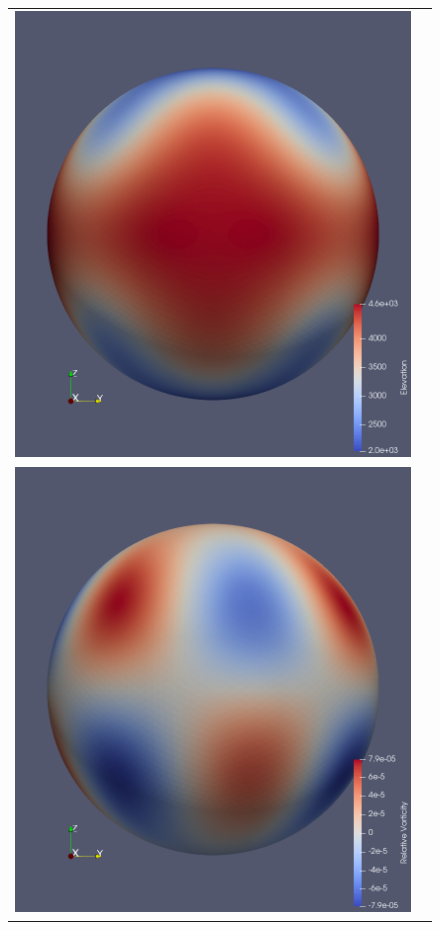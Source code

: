 \documentclass[a4paper]{article}
\begin{document}
\begin{figure}[t]
\begin{tabular}{cc}
 \hspace{-0em}\includegraphics[scale=0.125]{Images/elevation_0.png} \\
 \hspace{-0em}\includegraphics[scale=0.125]{Images/vorticity_24.png} &

\end{tabular}
\end{figure}
\end{document}
